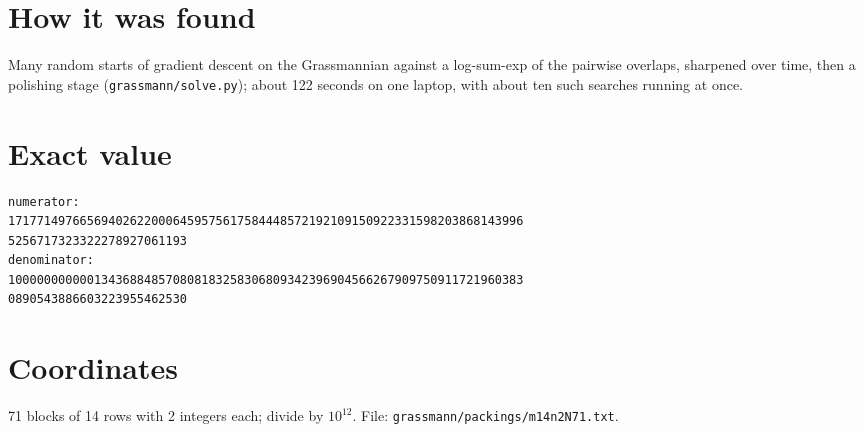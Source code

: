 \documentclass[11pt,a4paper]{article}
\begin{document}
\section{How it was found}
Many random starts of gradient descent on the Grassmannian against a log-sum-exp of the pairwise overlaps, sharpened over time, then a polishing stage (\texttt{grassmann/solve.py}); about 122 seconds on one laptop, with about ten such searches running at once.


\appendix
\section{Exact value}
{\small
\begin{verbatim}
numerator:
171771497665694026220006459575617584448572192109150922331598203868143996
5256717323322278927061193
denominator:
100000000000134368848570808183258306809342396904566267909750911721960383
0890543886603223955462530
\end{verbatim}}

\section{Coordinates}
71 blocks of 14 rows with 2 integers each; divide by $10^{12}$. File: \texttt{grassmann/packings/m14n2N71.txt}.
{\tiny
\begin{multicols}{4}
\end{multicols}}
\end{document}
